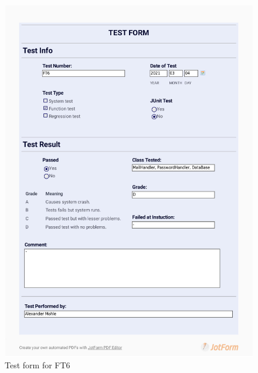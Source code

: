 \documentclass{article}
\begin{document}
 \begin{figure}
     \centering
     \includegraphics[width=13cm]{images/2021-03-04_Alexander_FT6-1}
     \renewcommand\figurename{Figure}
     \caption{Test form for FT6}
     \label{fig:my_label}
 \end{figure}
 
\end{document}
